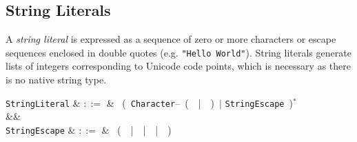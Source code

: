 \subsection{String Literals}

A {\em string literal} is expressed as a sequence of zero or more characters or escape sequences enclosed in double quotes (e.g. \lstinline{"Hello World"}).  String literals generate lists of integers corresponding to Unicode code points, which is necessary as there is no native string type.

\begin{syntax}
  \verb+StringLiteral+ & $::=$ & \ \big(\ \verb+Character+--\ \big(\ \token{\textbackslash}\ |\ \ \big)\ $|$ \verb+StringEscape+\ \big)$^*$\  \\
  &&\\
  \verb+StringEscape+ & $::=$ & \token{\textbackslash}\ \big(\ \token{\textbackslash}\ |\ \ |\ \ |\ \ \big)\\

\end{syntax}

